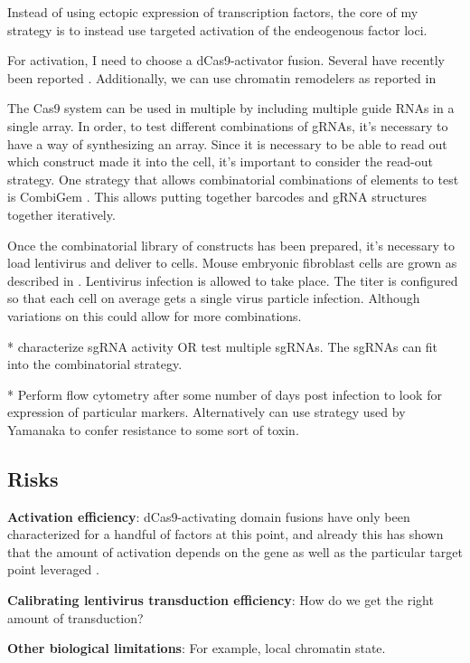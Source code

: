 \documentclass[10pt]{article}
\begin{document}
Instead of using ectopic expression of transcription factors, the core of my strategy is to instead use targeted activation of the endeogenous factor loci.

For activation, I need to choose a dCas9-activator fusion. Several have recently been reported \cite{chavez2015VPR, konermann2014genome}. Additionally, we can use chromatin remodelers as reported in

The Cas9 system can be used in multiple by including multiple guide RNAs in a single array. In order, to test different combinations of gRNAs, it's necessary to have a way of synthesizing an array. Since it is necessary to be able to read out which construct made it into the cell, it's important to consider the read-out strategy. One strategy that allows combinatorial combinations of elements to test is CombiGem \cite{cheng2014enhanced}. This allows putting together barcodes and gRNA structures together iteratively.

Once the combinatorial library of constructs has been prepared, it's necessary to load lentivirus and deliver to cells. Mouse embryonic fibroblast cells are grown as described in \cite{takahashi2006induction}. Lentivirus infection is allowed to take place. The titer is configured so that each cell on average gets a single virus particle infection. Although variations on this could allow for more combinations.

* characterize sgRNA activity OR test multiple sgRNAs. The sgRNAs can fit into the combinatorial strategy.

* Perform flow cytometry after some number of days post infection to look for expression of particular markers. Alternatively can use strategy used by Yamanaka to confer resistance to some sort of toxin.

\subsection*{Risks}

\textbf{Activation efficiency}: dCas9-activating domain fusions have only been characterized for a handful of factors at this point, and already this has shown that the amount of activation depends on the gene as well as the particular target point leveraged \cite{chavez2015VPR, konermann2014genome}.

\textbf{Calibrating lentivirus transduction efficiency}: How do we get the right amount of transduction?

\textbf{Other biological limitations}: For example, local chromatin state.
\end{document}
